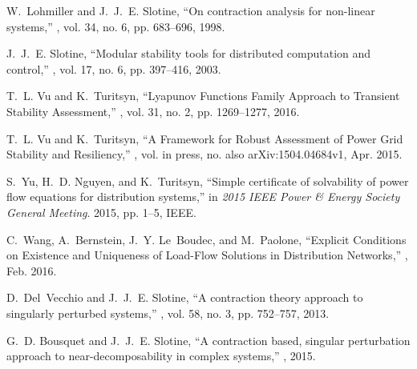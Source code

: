 \documentclass[letterpaper, 10 pt, conference]{ieeeconf}
\begin{document}
\begin{thebibliography}{10}
W.~Lohmiller and J.~J.~E. Slotine,
\newblock ``On contraction analysis for non-linear systems,''
, vol. 34, no. 6, pp. 683--696, 1998.

J.~J.~E. Slotine,
\newblock ``Modular stability tools for distributed computation and control,''
, vol. 17, no. 6, pp. 397--416, 2003.

T.~L. Vu and K.~Turitsyn,
\newblock ``{Lyapunov Functions Family Approach to Transient Stability
  Assessment},''
, vol. 31, no. 2, pp.
  1269--1277, 2016.

T.~L. Vu and K.~Turitsyn,
\newblock ``{A Framework for Robust Assessment of Power Grid Stability and
  Resiliency},''
, vol. in press, no.
  also arXiv:1504.04684v1, Apr. 2015.

S.~Yu, H.~D. Nguyen, and K.~Turitsyn,
\newblock ``{Simple certificate of solvability of power flow equations for
  distribution systems},''
\newblock in {\em 2015 IEEE Power {\&} Energy Society General Meeting}. 2015,
  pp. 1--5, IEEE.

C.~Wang, A.~Bernstein, J.~Y. Le~Boudec, and M.~Paolone,
\newblock ``{Explicit Conditions on Existence and Uniqueness of Load-Flow
  Solutions in Distribution Networks},''
, Feb. 2016.

D.~Del~Vecchio and J.~J.~E. Slotine,
\newblock ``A contraction theory approach to singularly perturbed systems,''
, vol. 58, no. 3, pp.
  752--757, 2013.

G.~D. Bousquet and J.~J.~E. Slotine,
\newblock ``A contraction based, singular perturbation approach to
  near-decomposability in complex systems,''
, 2015.

\end{thebibliography}
\end{document}
